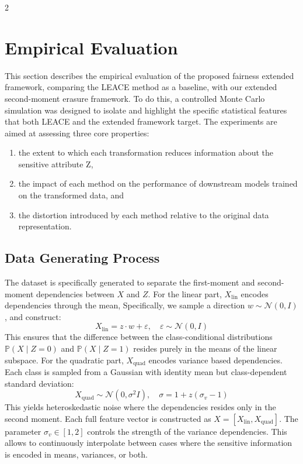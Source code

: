 \documentclass[ecta,nameyear,final]{econsocart}
\numberwithin{equation}{section}
\theoremstyle{plain}
\theoremstyle{definition}
\begin{document}
\begin{multicols}{2}
\section{Empirical Evaluation}
This section describes the empirical evaluation of the proposed fairness extended framework, comparing the LEACE method as a baseline, with our extended second-moment erasure framework.
\newline \newline
To do this, a controlled Monte Carlo simulation was designed to isolate and highlight the specific statistical features that both LEACE and the extended framework target.
\newline \newline
The experiments are aimed at assessing three core properties:
\begin{enumerate}
    \item the extent to which each transformation reduces information about the sensitive attribute Z,
    \item the impact of each method on the performance of downstream models trained on the transformed data, and
    \item  the distortion introduced by each method relative to the original data representation.
\end{enumerate}
\subsection{Data Generating Process}
The dataset is specifically generated to separate the first-moment and second-moment dependencies between $X$ and $Z$.
\newline \newline
For the linear part, $X_{\text{lin}}$ encodes dependencies through the mean, Specifically, we sample a direction $w \sim \mathcal{N}(0,I)$, and construct:
\begin{equation}
    X_{\text{lin}} = z\cdot w + \varepsilon,
    \quad \varepsilon \sim \mathcal{N}(0,I)
\end{equation}
This ensures that the difference between the class-conditional distributions $\mathbb{P}(X \mid Z = 0)$ and $\mathbb{P}(X \mid Z = 1)$ resides purely in the means of the linear subspace.
\newline \newline
For the quadratic part, $X_{\text{quad}}$ encodes variance based dependencies. Each class is sampled from a Gaussian with identity mean but class-dependent standard deviation:
\begin{equation}
    X_{\text{quad}} \sim \mathcal{N}(0,\sigma^2I), \quad \sigma = 1 + z(\sigma_v - 1)
\end{equation}
This yields heteroskedastic noise where the dependencies resides only in the second moment.
\newline \newline
Each full feature vector is constructed as $X = [X_{\text{lin}}, X_{\text{quad}}]$. The parameter $\sigma_v \in [1,2]$ controls the strength of the variance dependencies. This allows to continuously interpolate between cases where the sensitive information is encoded in means, variances, or both.

\end{multicols}
\end{document}
